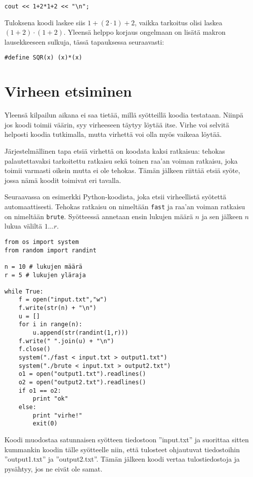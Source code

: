 \begin{lstlisting}
cout << 1+2*1+2 << "\n";
\end{lstlisting}

Tuloksena koodi laskee siis $1+(2 \cdot 1)+2$,
vaikka tarkoitus olisi laskea $(1+2) \cdot (1+2)$.
Yleensä helppo korjaus ongelmaan on lisätä makron
lausekkeeseen sulkuja, tässä tapauksessa seuraavasti:

\begin{lstlisting}
#define SQR(x) (x)*(x)
\end{lstlisting}

\section{Virheen etsiminen}

Yleensä kilpailun aikana ei saa tietää,
millä syötteillä koodia testataan.
Niinpä jos koodi toimii väärin, syy virheeseen
täytyy löytää itse.
Virhe voi selvitä helposti koodia tutkimalla,
mutta virhettä voi olla myös vaikeaa löytää.

Järjestelmällinen tapa etsiä virhettä on koodata kaksi
ratkaisua: tehokas palautettavaksi tarkoitettu
ratkaisu sekä toinen raa'an voiman ratkaisu,
joka toimii varmasti oikein mutta ei ole tehokas.
Tämän jälkeen riittää etsiä syöte,
jossa nämä koodit toimivat eri tavalla.

Seuraavassa on esimerkki Python-koodista,
joka etsii virheellistä syötettä automaattisesti.
Tehokas ratkaisu on nimeltään \texttt{fast}
ja raa'an voiman ratkaisu on nimeltään \texttt{brute}.
Syötteessä annetaan ensin lukujen määrä $n$ ja
sen jälkeen $n$ lukua väliltä $1 \ldots r$.

\begin{lstlisting}
from os import system
from random import randint

n = 10 # lukujen määrä
r = 5 # lukujen yläraja

while True:
    f = open("input.txt","w")
    f.write(str(n) + "\n")
    u = []
    for i in range(n):
        u.append(str(randint(1,r)))
    f.write(" ".join(u) + "\n")
    f.close()
    system("./fast < input.txt > output1.txt")
    system("./brute < input.txt > output2.txt")
    o1 = open("output1.txt").readlines()
    o2 = open("output2.txt").readlines()
    if o1 == o2:
        print "ok"
    else:
        print "virhe!"
        exit(0)
\end{lstlisting}

Koodi muodostaa satunnaisen syötteen tiedostoon ''input.txt''
ja suorittaa sitten kummankin koodin tälle syötteelle
niin, että tulosteet ohjautuvat tiedostoihin
''output1.txt'' ja ''output2.txt''.
Tämän jälkeen koodi vertaa tulostiedostoja ja
pysähtyy, jos ne eivät ole samat.

